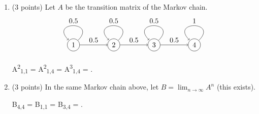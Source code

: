 \documentclass{amsart}
\begin{document}
\begin{enumerate}
\item (3 points) Let \(A\) be the transition matrix of the Markov chain.
\[\begin{tikzpicture}[node distance=2cm]
   \draw node[draw,circle] (1) {1} node[draw,circle, right of=1] (2) {2} node [draw,circle,right of=2] (3) {3} node [draw,circle,right of=3] (4) {4};
     \draw[->] (1) edge node[above] {\(0.5\)} (2)
     (2) edge node[above] {\(0.5\)} (3)
     (3) edge node[above] {\(0.5\)} (4)
     (1) edge [loop] node[above] {\(0.5\)} (1)
     (2) edge [loop] node[above] {\(0.5\)} (2)
     (3) edge [loop] node[above] {\(0.5\)} (3)
     (4) edge [loop] node[above] {\(1\)} (4);    
   \end{tikzpicture} \]
\begin{workbox}
\vspace{0.5cm}

A\textsuperscript{2}\textsubscript{1,1} = \hfill A\textsuperscript{2}\textsubscript{1,4} = \hfill A\textsuperscript{3}\textsubscript{1,4} = \hfill.

\vspace{0.5cm}
\end{workbox}

\item (3 points) In the same Markov chain above, let \(B = \lim_{n \to \infty} A^n\) (this exists).  
\begin{workbox}
\vspace{0.5cm}

B\textsubscript{4,4} = \hfill B\textsubscript{1,1} = \hfill B\textsubscript{3,4} =  \hfill.

\vspace{0.5cm}
\end{workbox}
\end{enumerate}
\end{document}
